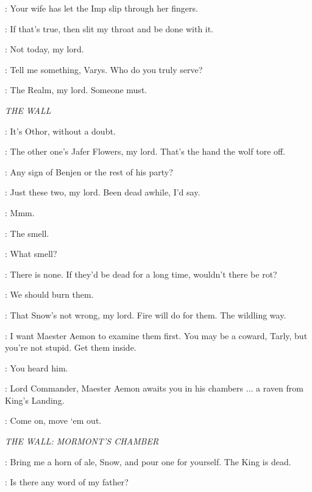 \VARYS: Your wife has let the Imp slip through her fingers. 

\NED: If that's true, then slit my throat and be done with it. 

\VARYS: Not today, my lord. 

\NED: Tell me something, Varys. Who do you truly serve? 

\VARYS: The Realm, my lord. Someone must. 


\scene

\textit{THE WALL}


\JEOR: It's Othor, without a doubt.

\OTHELLYARWYK:  The other one's Jafer Flowers, my lord. That's the hand the wolf tore off. 

\JEOR: Any sign of Benjen or the rest of his party? 

\JON: Just these two, my lord. Been dead awhile, I'd say. 

\JEOR: Mmm. 

\SAM: The smell. 

\OTHELLYARWYK: What smell? 

\SAM: There is none. If they'd be dead for a long time, wouldn't there be rot? 

\JON: We should burn them. 

\OTHELLYARWYK: That Snow's not wrong, my lord. Fire will do for them. The wildling way. 

\JEOR: I want Maester Aemon to examine them first. You may be a coward, Tarly, but you're not stupid. Get them inside. 

\OTHELLYARWYK: You heard him. 


\MESSENGER: Lord Commander, Maester Aemon awaits you in his chambers $\ldots$ a raven from King's Landing. 

\OTHELLYARWYK: Come on, move `em out. 


\scene

\textit{THE WALL: MORMONT'S CHAMBER} 


\JEOR: Bring me a horn of ale, Snow, and pour one for yourself.  The King is dead. 

\JON: Is there any word of my father? 

